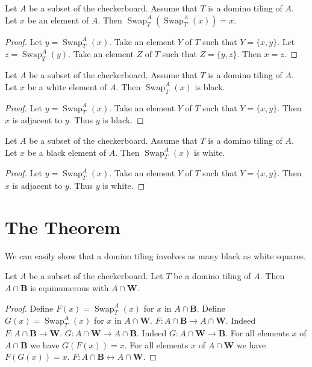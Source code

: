 \documentclass{article}
\newcommand{\Black}{\mathbf{B}}
\newcommand{\White}{\mathbf{W}}
\newcommand{\Sw}[3]{\operatorname{Swap}_{#1}^{#2}(#3)}
\begin{document}
\begin{forthel}
    \begin{lemma}
        Let $A$ be a subset of the checkerboard.
        Assume that $T$ is a domino tiling of $A$.
        Let $x$ be an element of $A$.
        Then $\Sw{T}{A}{\Sw{T}{A}{x}} = x$.
    \end{lemma}
    \begin{proof}
        Let $y = \Sw{T}{A}{x}$.
        Take an element $Y$ of $T$ such that $Y = \{x, y\}$.
        Let $z = \Sw{T}{A}{y}$.
        Take an element $Z$ of $T$ such that $Z = \{y, z\}$.
        Then $x = z$.
    \end{proof}

    \begin{lemma}
        Let $A$ be a subset of the checkerboard.
        Assume that $T$ is a domino tiling of $A$.
        Let $x$ be a white element of $A$.
        Then $\Sw{T}{A}{x}$ is black.
    \end{lemma}
    \begin{proof}
        Let $y = \Sw{T}{A}{x}$.
        Take an element $Y$ of $T$ such that $Y = \{x,y\}$.
        Then $x$ is adjacent to $y$. Thus $y$ is black.
    \end{proof}

    \begin{lemma}
        Let $A$ be a subset of the checkerboard.
        Assume that $T$ is a domino tiling of $A$.
        Let $x$ be a black element of $A$.
        Then $\Sw{T}{A}{x}$ is white.
    \end{lemma}
    \begin{proof}
        Let $y = \Sw{T}{A}{x}$.
        Take an element $Y$ of $T$ such that $Y = \{x,y\}$.
        Then $x$ is adjacent to $y$. Thus $y$ is white.
    \end{proof}
\end{forthel}

\section{The Theorem}

\noindent We can easily show that a domino tiling involves as many black as white squares.

\begin{forthel}
    \begin{lemma}
        Let $A$ be a subset of the checkerboard.
        Let $T$ be a domino tiling of $A$.
        Then $A \cap \Black$ is
        equinumerous with $A \cap \White$.
    \end{lemma}
    \begin{proof}
        Define $F(x) = \Sw{T}{A}{x}$ for $x$ in $A \cap \Black$.
        Define $G(x) = \Sw{T}{A}{x}$ for $x$ in $A \cap \White$.
        $F: A \cap \Black \to A \cap \White$.
        Indeed  $F: A \cap \Black \to \White$.
        $G: A \cap \White \to A \cap \Black$.
        Indeed  $G: A \cap \White \to \Black$.
        For all elements $x$ of $A \cap \Black$ we have $G(F(x))=x$.
        For all elements $x$ of $A \cap \White$ we have $F(G(x))=x$.
        $F : A \cap \Black \leftrightarrow A \cap \White$.
    \end{proof}
\end{forthel}
\end{document}
